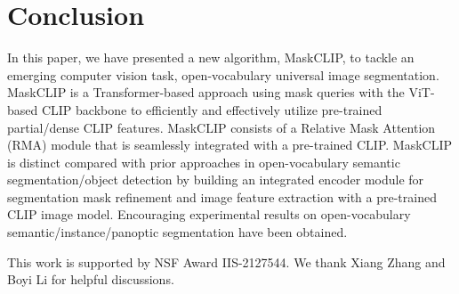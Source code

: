 \documentclass{article}
\theoremstyle{plain}
\theoremstyle{definition}
\theoremstyle{remark}
\begin{document}
\begin{table}[!htp]
\begin{center}
\caption{\textbf{Ablation Study on Mask Refinement.} Results on ADE20K validation set are reported here. Both methods are trained on COCO and tested on ADE20K validation dataset. MR refers to mask refinement.}
\label{tab:ablation_mr}
\end{center}
\end{table}

\section{Conclusion}

In this paper, we have presented a new algorithm, MaskCLIP, to tackle an emerging computer vision task, open-vocabulary universal image segmentation. MaskCLIP is a Transformer-based approach using mask queries with the ViT-based CLIP backbone to efficiently and effectively utilize pre-trained partial/dense CLIP features. MaskCLIP consists of a Relative Mask Attention (RMA) module that is seamlessly integrated with a pre-trained CLIP. MaskCLIP is distinct  compared with prior approaches in open-vocabulary semantic segmentation/object detection by building an integrated encoder module for segmentation mask refinement and image feature extraction with a pre-trained CLIP image model. Encouraging experimental results on open-vocabulary semantic/instance/panoptic segmentation have been obtained.

 This work is supported by NSF Award IIS-2127544. We thank Xiang Zhang and Boyi Li for helpful discussions.








\newpage
\appendix
\onecolumn
\end{document}
